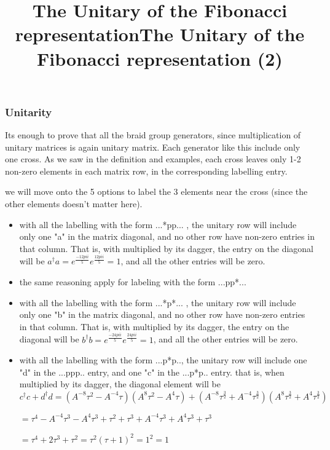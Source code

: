 \documentclass{article}
\begin{document}
\subsubsection{Unitarity}
\title{The Unitary of the Fibonacci representation}
Its enough to prove that all the braid group generators, since multiplication of unitary matrices is again unitary matrix. Each generator like this include only one cross. As we saw in the definition and examples, each cross leaves only 1-2 non-zero elements in each matrix row, in the corresponding labelling entry.

we will move onto the 5 options to label the 3 elements near the cross (since the other elements doesn't matter here).
\begin{itemize}
\item with all the labelling with the form ...*pp... , the unitary row will include only one "a" in the matrix diagonal, and no other row have non-zero entries in that column. That is, with multiplied by its dagger, the entry on the diagonal will be $a^{\dagger}a = e^{\frac{-12{pi}i}{5}}e^{\frac{12{pi}i}{5}} = 1$, and all the other entries will be zero.
\item the same reasoning apply for labeling with the form ...pp*...  
\end{itemize}


\title{The Unitary of the Fibonacci representation (2) }
\begin{itemize}
\item with all the labelling with the form ...*p*... , the unitary row will include only one "b" in the matrix diagonal, and no other row have non-zero entries in that column. That is, with multiplied by its dagger, the entry on the diagonal will be $b^{\dagger}b = e^{\frac{-24{pi}i}{5}}e^{\frac{24{pi}i}{5}} = 1$, and all the other entries will be zero.
\item  with all the labelling with the form ...p*p.., the unitary row will include one "d" in the ...ppp.. entry, and one "c" in the ...p*p.. entry. that is, when multiplied by its dagger, the diagonal element will be $c^{\dagger}c + d^{\dagger}d = (A^{-8}\tau^{2} - A^{-4}\tau)(A^{8}\tau^{2} - A^{4}\tau) + (A^{-8}\tau^{\frac{3}{2}} + A^{-4}\tau^{\frac{3}{2}})(A^{8}\tau^{\frac{3}{2}} + A^{4}\tau^{\frac{3}{2}})$

$ = \tau^{4} - A^{-4}\tau^{3} - A^{4}\tau^{3} + \tau^{2} + \tau^{3} + A^{-4}\tau^{3} + A^{4}\tau^{3} + \tau^{3}$

$ = \tau^{4} + 2\tau^{3} + \tau^{2} = {\tau^{2}(\tau+1)}^{2} = 1^{2} = 1$ 
\end{itemize}
\end{document}
